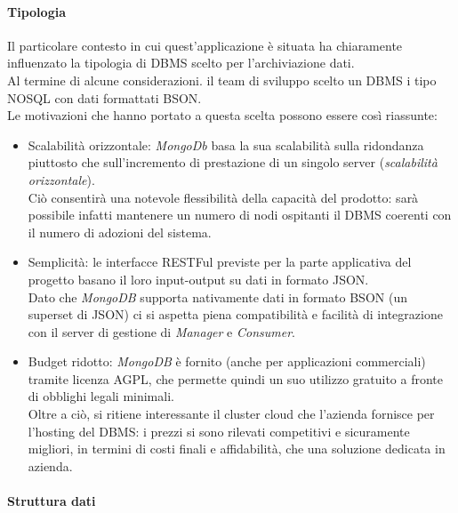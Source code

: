 \documentclass[12pt]{article}
\begin{document}
\paragraph{Tipologia}
Il particolare contesto in cui quest'applicazione è situata ha chiaramente influenzato la tipologia di DBMS scelto per l'archiviazione dati.\\
Al termine di alcune considerazioni. il team di sviluppo scelto un DBMS i tipo NOSQL con dati formattati BSON.\\Le motivazioni che hanno portato a questa scelta possono essere così riassunte: 
\begin{itemize}
\item Scalabilità orizzontale: \textit{MongoDb} basa la sua scalabilità sulla ridondanza piuttosto che sull'incremento di prestazione di un singolo server (\textit{scalabilità orizzontale}).\\
Ciò consentirà una notevole flessibilità della capacità del prodotto: sarà possibile infatti mantenere un numero di nodi ospitanti il DBMS coerenti con il numero di adozioni del sistema.
\item Semplicità: le interfacce RESTFul previste per la parte applicativa del progetto basano il loro input-output su dati in formato JSON.\\ Dato che \textit{MongoDB} supporta nativamente dati in formato BSON (un superset di JSON) ci si aspetta piena compatibilità e facilità di integrazione con il server di gestione di \textit{Manager} e \textit{Consumer}.
\item Budget ridotto: \textit{MongoDB} è fornito (anche per applicazioni commerciali) tramite licenza AGPL, che permette quindi un suo utilizzo gratuito a fronte di obblighi legali minimali.\\ Oltre a ciò, si ritiene interessante il cluster cloud che l'azienda fornisce per l'hosting del DBMS: i prezzi si sono rilevati competitivi e sicuramente migliori, in termini di costi finali e affidabilità, che una soluzione dedicata in azienda.
\end{itemize}
\paragraph{Struttura dati}
\end{document}
